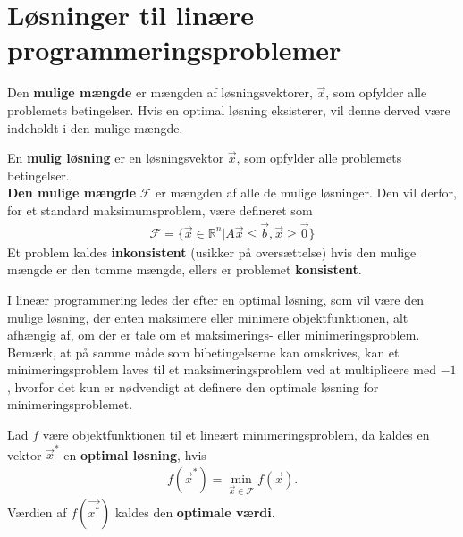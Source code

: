 \section{Løsninger til linære programmeringsproblemer}

Den \textbf{mulige mængde} er mængden af løsningsvektorer, $\vec{x}$, som opfylder alle problemets betingelser. Hvis en optimal løsning eksisterer, vil denne derved være indeholdt i den mulige mængde.

\begin{defn}
En \textbf{mulig løsning} er en løsningsvektor $\vec{x}$, som opfylder alle problemets betingelser.\\
\textbf{Den mulige mængde} $\mathcal{F}$ er mængden af alle de mulige løsninger. Den vil derfor, for et standard maksimumsproblem, være defineret som
\begin{align*}
\mathcal{F}=\{\vec{x} \in \mathds{R}^n|A\vec{x} \leq \vec{b}, \vec{x} \geq \vec{0}\}
\end{align*}
Et problem kaldes \textbf{inkonsistent} (usikker på oversættelse) hvis den mulige mængde er den tomme mængde, ellers er problemet \textbf{konsistent}. %
\end{defn}

I lineær programmering ledes der efter en optimal løsning, som vil være den mulige løsning, der enten maksimere eller minimere objektfunktionen, alt afhængig af, om der er tale om et maksimerings- eller minimeringsproblem. 
Bemærk, at på samme måde som bibetingelserne kan omskrives, kan et minimeringsproblem laves til et maksimeringsproblem ved at multiplicere med $-1$, hvorfor det kun er nødvendigt at definere den optimale løsning for minimeringsproblemet.
\begin{defn}
Lad $f$ være objektfunktionen til et lineært minimeringsproblem, da kaldes en vektor $\vec{x}^*$ en \textbf{optimal løsning}, hvis 
\begin{align}
	f(\vec{x}^*)=\min\limits_{\vec{x} \in \mathcal{F}}f(\vec{x}).
\end{align}
Værdien af $f(\vec{x^*})$ kaldes den \textbf{optimale værdi}.
\end{defn}

